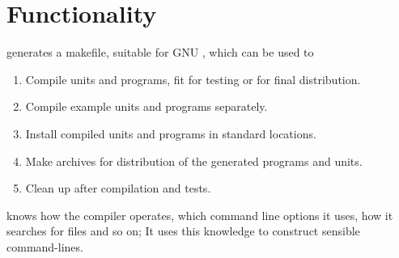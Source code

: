 {\section{Functionality}
\label{se:fpcmakefunctionality}
 generates a makefile, suitable for GNU , 
which can be used to 
\begin{enumerate}
\item Compile units and programs, fit for testing or for final distribution.
\item Compile example units and programs separately.
\item Install compiled units and programs in standard locations.
\item Make archives for distribution of the generated programs and units.
\item Clean up after compilation and tests.
\end{enumerate}
 knows how the \fpc compiler operates, which command line
options it uses, how it searches for files and so on; It uses this knowledge
to construct sensible command-lines. 

}
